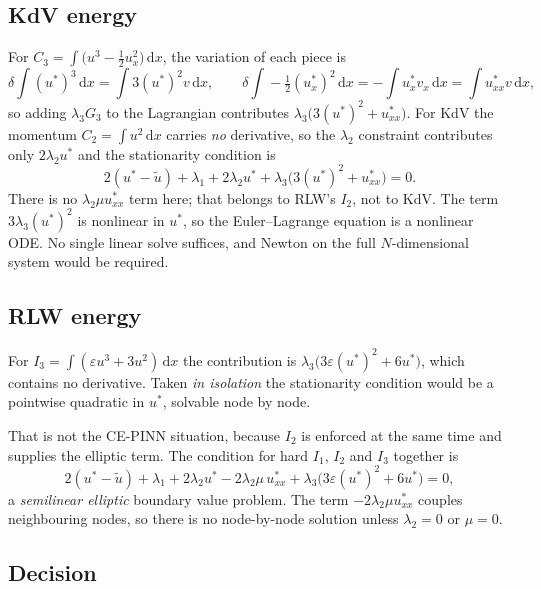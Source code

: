 \documentclass[11pt,a4paper]{article}
\theoremstyle{remark}
\newcommand{\dx}{\,\mathrm{d}x}
\newcommand{\ut}{\tilde{u}}
\newcommand{\us}{u^{*}}
\begin{document}
\subsection{KdV energy}

For $C_3 = \int\big(u^3 - \tfrac12 u_x^2\big)\dx$, the variation of each piece is
\begin{equation}
\delta\!\int (\us)^3\dx = \int 3(\us)^2 v\dx,
\qquad
\delta\!\int\!-\tfrac12(\us_x)^2\dx = -\int \us_x v_x\dx = \int \us_{xx}v\dx ,
\end{equation}
so adding $\lambda_3 G_3$ to the Lagrangian contributes
$\lambda_3\big(3(\us)^2 + \us_{xx}\big)$. For KdV the momentum
$C_2 = \int u^2\dx$ carries \emph{no} derivative, so the $\lambda_2$ constraint
contributes only $2\lambda_2\us$ and the stationarity condition is
\begin{equation}
2(\us-\ut) + \lambda_1 + 2\lambda_2\us
+ \lambda_3\Big(3(\us)^2 + \us_{xx}\Big) = 0 .
\end{equation}
There is no $\lambda_2\mu\us_{xx}$ term here; that belongs to RLW's $I_2$, not
to KdV. The term $3\lambda_3(\us)^2$ is nonlinear in $\us$, so the
Euler--Lagrange equation is a nonlinear ODE. No single linear solve suffices,
and Newton on the full $N$-dimensional system would be required.

\subsection{RLW energy}

For $I_3 = \int(\varepsilon u^3+3u^2)\dx$ the contribution is
$\lambda_3\big(3\varepsilon(\us)^2 + 6\us\big)$, which contains no derivative.
Taken \emph{in isolation} the stationarity condition would be a pointwise
quadratic in $\us$, solvable node by node.

That is not the CE-PINN situation, because $I_2$ is enforced at the same time
and supplies the elliptic term. The condition for hard $I_1$, $I_2$ and $I_3$
together is
\begin{equation}
2(\us-\ut) + \lambda_1 + 2\lambda_2\us - 2\lambda_2\mu\,\us_{xx}
+ \lambda_3\Big(3\varepsilon(\us)^2 + 6\us\Big) = 0 ,
\end{equation}
a \emph{semilinear elliptic} boundary value problem. The term
$-2\lambda_2\mu\us_{xx}$ couples neighbouring nodes, so there is no node-by-node
solution unless $\lambda_2 = 0$ or $\mu = 0$.

\subsection{Decision}
\end{document}
